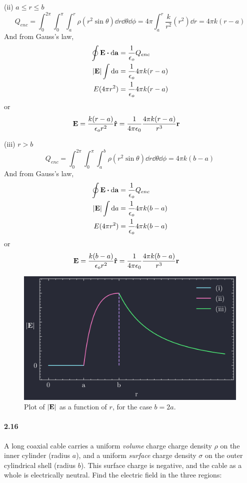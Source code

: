 \documentclass[../main.tex]{subfiles}
\begin{document}
(ii) \(a\leq r \leq b\)
\[ Q_{enc} = \int_0^{2\pi} \int_0^\pi \int_a^r \rho (r^2 \sin\theta) \dd{r} \dd{\theta} \dd{\phi}
= 4\pi \int_a^r \frac{k}{r^2} (r^2) \dd{r} = 4\pi k (r - a) \]
And from Gauss's law,
\begin{align*}
    \oint \vb{E} \vdot \dd{\vb{a}} &= \frac{1}{\epsilon_o} Q_{enc} \\
    \abs{\vb{E}} \int \dd{a} &= \frac{1}{\epsilon_o} 4\pi k (r - a) \\
    E (4\pi r^2) &= \frac{1}{\epsilon_o} 4\pi k (r - a)
\end{align*}
or 
\begin{align*}
    \vb{E} &= \frac{k (r - a)}{\epsilon_o r^2} \vu{r} = \frac{1}{4\pi\epsilon_0} \frac{4\pi k(r - a)}{r^3} \vb{r}
\end{align*}

(iii) \(r>b\)
\[ Q_{enc} = \int_0^{2\pi} \int_0^\pi \int_a^b \rho (r^2 \sin\theta) \dd{r} \dd{\theta} \dd{\phi}
= 4\pi k (b - a) \]
And from Gauss's law,
\begin{align*}
    \oint \vb{E} \vdot \dd{\vb{a}} &= \frac{1}{\epsilon_o} Q_{enc} \\
    \abs{\vb{E}} \int \dd{a} &= \frac{1}{\epsilon_o} 4\pi k (b - a) \\
    E (4\pi r^2) &= \frac{1}{\epsilon_o} 4\pi k (b - a)
\end{align*}
or
\begin{align*}
    \vb{E} &= \frac{k (b - a)}{\epsilon_o r^2} \vu{r} = \frac{1}{4\pi\epsilon_0} \frac{4\pi k(b - a)}{r^3} \vb{r}
\end{align*}
\begin{figure}[ht]
    \centering
    \includegraphics[width=0.5\linewidth]{images/fig2_15.png}
    \captionsetup{width=0.8\linewidth}
    \caption{Plot of $\abs{\vb{E}}$ as a function of $r$, for the case $b = 2a$.}
    \label{fig:2_15}
\end{figure}

\paragraph{2.16} \label{prob:2_16}
A long coaxial cable carries a uniform \emph{volume} charge charge density $\rho$ on the inner
cylinder (radius $a$), and a uniform \emph{surface} charge density $\sigma$ on the outer cylindrical
shell (radius $b$). This surface charge is negative, and the cable as a whole is electrically
neutral. Find the electric field in the three regions:
\end{document}

